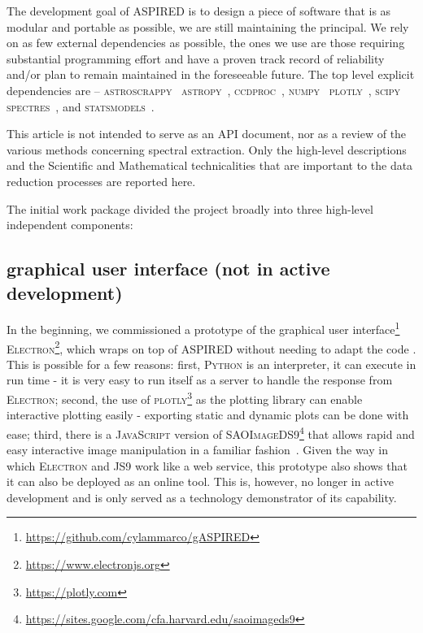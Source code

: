 \documentclass[fleqn,usenatbib]{mnras}
\begin{document}
The development goal of ASPIRED is to design a piece of software that is as modular and
portable as possible, we are still maintaining the principal. We rely on as few
external dependencies as possible, the ones we use are those requiring substantial
programming effort and have a proven track record of reliability and/or
plan to remain maintained  in the foreseeable future. The top
level explicit dependencies are --
\textsc{astroscrappy}~\citep{curtis_mccully_2018_1482019, 2001PASP..113.1420V}
\textsc{astropy}~\citep{astropy:2013, astropy:2018},
\textsc{ccdproc}~\citep{matt_craig_2017_1069648},
\textsc{numpy}~\citep{2020NumPy-Array}
\textsc{plotly}~\citep{plotly},
\textsc{scipy}~\citep{2020SciPy-NMeth}
\textsc{spectres}~\citep{2017arXiv170505165C}, and
\textsc{statsmodels}~\citep{seabold2010statsmodels}. 

This article is not intended to serve as an API document, nor as a review of the
various methods concerning spectral extraction. Only the high-level
descriptions and the Scientific and Mathematical technicalities that are
important to the data reduction processes are reported here. 

The initial
work package divided the project broadly into three high-level independent
components:

\subsection*{graphical user interface (not in active development)}
In the beginning, we commissioned a prototype of the graphical user
interface\footnote{\url{https://github.com/cylammarco/gASPIRED}}
\textsc{Electron}\footnote{\url{https://www.electronjs.org}}, which wraps on top of
\textsc{ASPIRED} without needing to adapt the code . This is
possible for a few reasons: first, \textsc{Python} is an interpreter, it can execute
in run time - it is very easy to run itself as a server to handle the response from 
\textsc{Electron}; second, the use of
\textsc{plotly}\footnote{\url{https://plotly.com}} as the plotting
library can enable interactive plotting easily - exporting static and dynamic plots
can be done with ease; third, there is a \textsc{JavaScript} version of
\textsc{SAOImageDS9}\footnote{\url{https://sites.google.com/cfa.harvard.edu/saoimageds9}}
that allows rapid and easy interactive image manipulation in a familiar
fashion~\citep{eric_mandel_2021_596052}. Given the way in which \textsc{Electron} and
\textsc{JS9} work like a web service, this prototype also shows that it can also
be deployed as an online tool. This is, however, no longer in active development
and is only served as a technology demonstrator of its capability.
\end{document}

